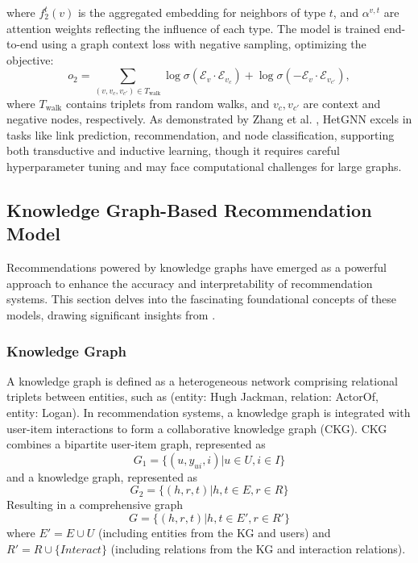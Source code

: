 \documentclass{ieeeaccess}
\begin{document}
where \( f_2^t(v) \) is the aggregated embedding for neighbors of type \( t \), and \( \alpha^{v,t} \) are attention weights reflecting the influence of each type. The model is trained end-to-end using a graph context loss with negative sampling, optimizing the objective:
\begin{equation}
o_2 = \sum_{(v, v_c, v_{c'}) \in T_{\text{walk}}} \log \sigma(\mathcal{E}_v \cdot \mathcal{E}_{v_c}) + \log \sigma(-\mathcal{E}_v \cdot \mathcal{E}_{v_{c'}}),
\end{equation}
where \( T_{\text{walk}} \) contains triplets from random walks, and \( v_c, v_{c'} \) are context and negative nodes, respectively. As demonstrated by Zhang et al. \cite{zhang2019hetgnn}, HetGNN excels in tasks like link prediction, recommendation, and node classification, supporting both transductive and inductive learning, though it requires careful hyperparameter tuning and may face computational challenges for large graphs.

\subsection{Knowledge Graph-Based Recommendation Model}

Recommendations powered by knowledge graphs have emerged as a powerful approach to enhance the accuracy and interpretability of recommendation systems. This section delves into the fascinating foundational concepts of these models, drawing significant insights from \cite{wang2019kgat}.

\subsubsection{Knowledge Graph}

A knowledge graph is defined as a heterogeneous network comprising relational triplets between entities, such as (entity: Hugh Jackman, relation: ActorOf, entity: Logan). In recommendation systems, a knowledge graph is integrated with user-item interactions to form a collaborative knowledge graph (CKG). CKG combines a bipartite user-item graph, represented as
\begin{equation}
    G_1 = \{ (u, y_{ui}, i) | u \in U, i \in I\}
\end{equation}
and a knowledge graph, represented as
\begin{equation}
    G_2 = \{ (h, r, t) | h, t \in E, r \in R\}
\end{equation}
Resulting in a comprehensive graph
\begin{equation}
    G = \{ (h, r, t) | h, t \in E' , r \in R' \}
\end{equation}
where \( E' = E \cup U \) (including entities from the KG and users) and \( R' = R \cup \{Interact\} \) (including relations from the KG and interaction relations).
\end{document}
